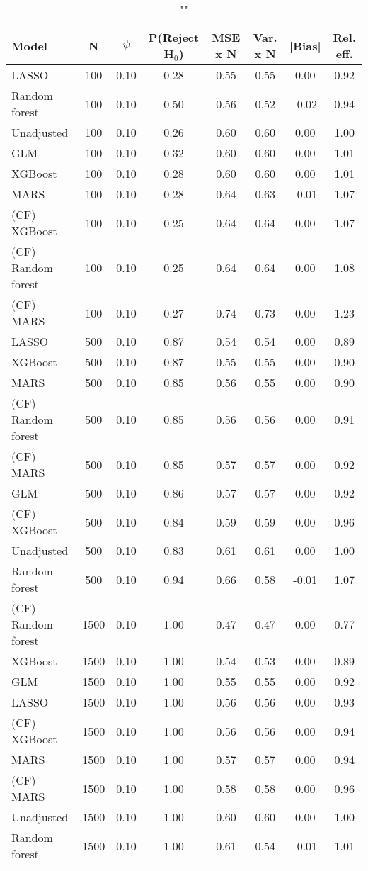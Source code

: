 \begin{table}
\centering
\caption{""}
\begin{tabular}{lccccccc}
\toprule
Model & N & $\psi$ & P(Reject H$_0$) & MSE x N & Var. x N & |Bias| & Rel. eff.\\ \midrule
LASSO & 100 & 0.10 & 0.28 & 0.55 & 0.55 &  0.00 & 0.92 \\ 
Random forest & 100 & 0.10 & 0.50 & 0.56 & 0.52 & -0.02 & 0.94 \\ 
Unadjusted & 100 & 0.10 & 0.26 & 0.60 & 0.60 &  0.00 & 1.00 \\ 
GLM & 100 & 0.10 & 0.32 & 0.60 & 0.60 &  0.00 & 1.01 \\ 
XGBoost & 100 & 0.10 & 0.28 & 0.60 & 0.60 &  0.00 & 1.01 \\ 
MARS & 100 & 0.10 & 0.28 & 0.64 & 0.63 & -0.01 & 1.07 \\ 
(CF) XGBoost & 100 & 0.10 & 0.25 & 0.64 & 0.64 &  0.00 & 1.07 \\ 
(CF) Random forest & 100 & 0.10 & 0.25 & 0.64 & 0.64 &  0.00 & 1.08 \\ 
(CF) MARS & 100 & 0.10 & 0.27 & 0.74 & 0.73 &  0.00 & 1.23 \\ \addlinespace 
LASSO & 500 & 0.10 & 0.87 & 0.54 & 0.54 &  0.00 & 0.89 \\ 
XGBoost & 500 & 0.10 & 0.87 & 0.55 & 0.55 &  0.00 & 0.90 \\ 
MARS & 500 & 0.10 & 0.85 & 0.56 & 0.55 &  0.00 & 0.90 \\ 
(CF) Random forest & 500 & 0.10 & 0.85 & 0.56 & 0.56 &  0.00 & 0.91 \\ 
(CF) MARS & 500 & 0.10 & 0.85 & 0.57 & 0.57 &  0.00 & 0.92 \\ 
GLM & 500 & 0.10 & 0.86 & 0.57 & 0.57 &  0.00 & 0.92 \\ 
(CF) XGBoost & 500 & 0.10 & 0.84 & 0.59 & 0.59 &  0.00 & 0.96 \\ 
Unadjusted & 500 & 0.10 & 0.83 & 0.61 & 0.61 &  0.00 & 1.00 \\ 
Random forest & 500 & 0.10 & 0.94 & 0.66 & 0.58 & -0.01 & 1.07 \\ \addlinespace 
(CF) Random forest & 1500 & 0.10 & 1.00 & 0.47 & 0.47 &  0.00 & 0.77 \\ 
XGBoost & 1500 & 0.10 & 1.00 & 0.54 & 0.53 &  0.00 & 0.89 \\ 
GLM & 1500 & 0.10 & 1.00 & 0.55 & 0.55 &  0.00 & 0.92 \\ 
LASSO & 1500 & 0.10 & 1.00 & 0.56 & 0.56 &  0.00 & 0.93 \\ 
(CF) XGBoost & 1500 & 0.10 & 1.00 & 0.56 & 0.56 &  0.00 & 0.94 \\ 
MARS & 1500 & 0.10 & 1.00 & 0.57 & 0.57 &  0.00 & 0.94 \\ 
(CF) MARS & 1500 & 0.10 & 1.00 & 0.58 & 0.58 &  0.00 & 0.96 \\ 
Unadjusted & 1500 & 0.10 & 1.00 & 0.60 & 0.60 &  0.00 & 1.00 \\ 
Random forest & 1500 & 0.10 & 1.00 & 0.61 & 0.54 & -0.01 & 1.01 \\
\bottomrule
\end{tabular}
\end{table}

